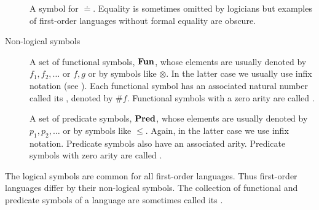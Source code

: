 \begin{definition}
\begin{description}
\begin{thmenum}[series=def:first_order_language]
       A symbol for  \( \doteq \). Equality is sometimes omitted by logicians but examples of first-order languages without formal equality are obscure.
    \end{thmenum}

    \item[Non-logical symbols]
    \hfill
    \begin{thmenum}[resume=def:first_order_language]
       A set of functional symbols, \( \operatorname{\mathbf{Fun}} \), whose elements are usually denoted by \( f_1, f_2, \ldots \) or \( f, g \) or by symbols like \( \otimes \). In the latter case we usually use infix notation (see ). Each functional symbol has an associated natural number called its , denoted by \( \# f \). Functional symbols with a zero arity are called .

       A set of predicate symbols, \( \operatorname{\mathbf{Pred}} \), whose elements are usually denoted by \( p_1, p_2, \ldots \) or by symbols like \( \leq \). Again, in the latter case we use infix notation. Predicate symbols also have an associated arity. Predicate symbols with zero arity are called .
    \end{thmenum}
  \end{description}

  The logical symbols are common for all first-order languages. Thus first-order languages differ by their non-logical symbols. The collection of functional and predicate symbols of a language are sometimes called its .
\end{definition}

